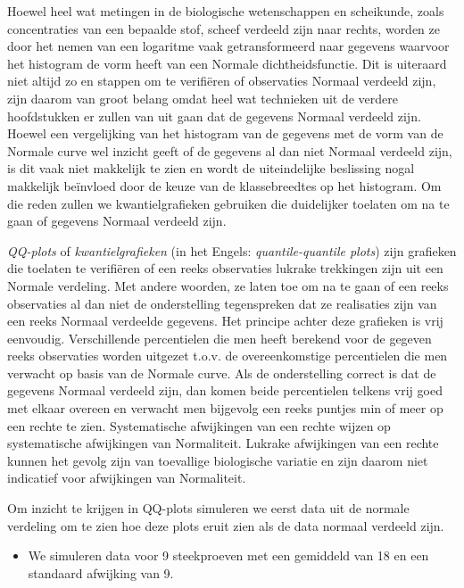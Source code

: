\documentclass[
  12pt,dutch,coursenotes]{book}
\providecommand{\tightlist}{%
  \setlength{\itemsep}{0pt}\setlength{\parskip}{0pt}}
\begin{document}
Hoewel heel wat metingen in de biologische wetenschappen en scheikunde, zoals
concentraties van een bepaalde stof, scheef verdeeld zijn naar rechts,
worden ze door het nemen van een logaritme vaak getransformeerd naar
gegevens waarvoor het histogram de vorm heeft van een Normale dichtheidsfunctie.
Dit is uiteraard niet altijd zo en stappen om te verifiëren of observaties
Normaal verdeeld zijn, zijn daarom van groot belang omdat heel wat technieken uit de verdere hoofdstukken er zullen van uit gaan dat de
gegevens Normaal verdeeld zijn. Hoewel een vergelijking van het histogram
van de gegevens met de vorm van de Normale curve wel inzicht geeft of de
gegevens al dan niet Normaal verdeeld zijn, is dit vaak niet makkelijk te
zien en wordt de uiteindelijke beslissing nogal makkelijk beïnvloed door de keuze
van de klassebreedtes op het histogram. Om die reden zullen we
kwantielgrafieken gebruiken die duidelijker toelaten om na te gaan of
gegevens Normaal verdeeld zijn.

\emph{QQ-plots} of \emph{kwantielgrafieken} (in het Engels: \emph{quantile-quantile plots}) zijn grafieken die toelaten te verifiëren of een
reeks observaties lukrake trekkingen zijn uit een Normale verdeling. Met
andere woorden, ze laten toe om na te gaan of een reeks observaties al dan
niet de onderstelling tegenspreken dat ze realisaties zijn van een reeks
Normaal verdeelde gegevens. Het principe achter deze grafieken is vrij
eenvoudig. Verschillende percentielen die men heeft berekend voor de gegeven
reeks observaties worden uitgezet t.o.v. de overeenkomstige percentielen die
men verwacht op basis van de Normale curve. Als de onderstelling correct is
dat de gegevens Normaal verdeeld zijn, dan komen beide percentielen telkens
vrij goed met elkaar overeen en verwacht men bijgevolg een reeks puntjes min
of meer op een rechte te zien.
Systematische afwijkingen van een rechte wijzen op systematische afwijkingen
van Normaliteit. Lukrake afwijkingen van een rechte kunnen het gevolg zijn
van toevallige biologische variatie en zijn daarom niet indicatief voor afwijkingen van
Normaliteit.

Om inzicht te krijgen in QQ-plots simuleren we eerst data uit de normale verdeling om te zien hoe deze plots eruit zien als de data normaal verdeeld zijn.

\begin{itemize}
\tightlist
\item
  We simuleren data voor 9 steekproeven met een gemiddeld van 18 en een standaard afwijking van 9.
\end{itemize}
\end{document}
